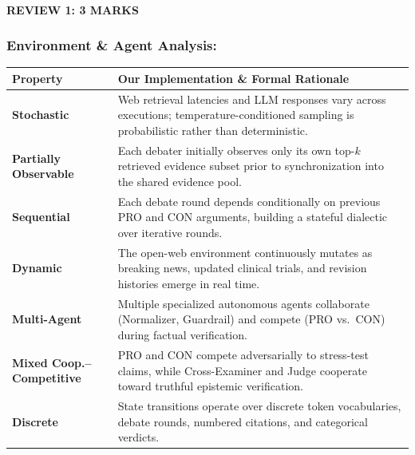 \documentclass[aspectratio=169, 10pt]{beamer}
\begin{document}
\begin{frame}
    \framesubtitle{REVIEW 1: 3 MARKS}
    \frametitle{Environment \& Agent Analysis:}
    \vspace{-0.1cm}
    \setlength{\tabcolsep}{4pt}
    \renewcommand{\arraystretch}{1.12}
    \scriptsize
    \noindent
    \begin{tabularx}{\textwidth}{l >{\raggedright\arraybackslash}X}
        \toprule
        \rowcolor{HeaderBg}
        \textbf{Property} & \textbf{Our Implementation \& Formal Rationale} \\
        \midrule
        \textbf{Stochastic} & Web retrieval latencies and LLM responses vary across executions; temperature-conditioned sampling is probabilistic rather than deterministic. \\
        \rowcolor{RowAlt}
        \textbf{Partially Observable} & Each debater initially observes only its own top-$k$ retrieved evidence subset prior to synchronization into the shared evidence pool. \\
        \textbf{Sequential} & Each debate round depends conditionally on previous PRO and CON arguments, building a stateful dialectic over iterative rounds. \\
        \rowcolor{RowAlt}
        \textbf{Dynamic} & The open-web environment continuously mutates as breaking news, updated clinical trials, and revision histories emerge in real time. \\
        \textbf{Multi-Agent} & Multiple specialized autonomous agents collaborate (Normalizer, Guardrail) and compete (PRO vs.\ CON) during factual verification. \\
        \rowcolor{RowAlt}
        \textbf{Mixed Coop.--Competitive} & PRO and CON compete adversarially to stress-test claims, while Cross-Examiner and Judge cooperate toward truthful epistemic verification. \\
        \textbf{Discrete} & State transitions operate over discrete token vocabularies, debate rounds, numbered citations, and categorical verdicts. \\
        \bottomrule
    \end{tabularx}
\end{frame}
\end{document}
